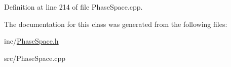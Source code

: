 Definition at line 214 of file Phase\-Space.\-cpp.



The documentation for this class was generated from the following files\-:\begin{DoxyCompactItemize}
\item 
inc/\hyperlink{PhaseSpace_8h}{Phase\-Space.\-h}\item 
src/Phase\-Space.\-cpp\end{DoxyCompactItemize}
